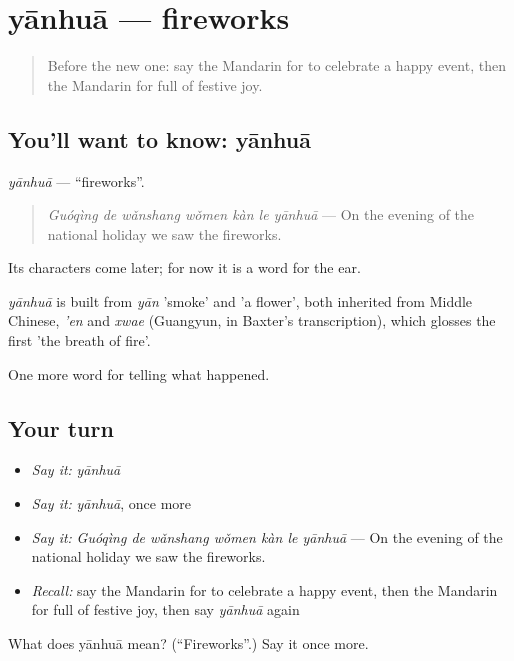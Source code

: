 \section[yānhuā]{yānhuā — fireworks}

\label{lesson:ZH-C339-yanhua}



\begin{quote}
Before the new one: say the Mandarin for to celebrate a happy event, then the Mandarin for full of festive joy.
\end{quote}

\subsection*{You'll want to know: yānhuā}
\emph{yānhuā} — \textquotedblleft{}fireworks\textquotedblright{}.

\begin{quote}
\emph{Guóqìng de wǎnshang wǒmen kàn le yānhuā} — On the evening of the national holiday we saw the fireworks.
\end{quote}

Its characters come later; for now it is a word for the ear.

\begin{cousinweb}
\emph{yānhuā} is built from \emph{yān} 'smoke' and  'a flower', both inherited from Middle Chinese, \emph{'en} and \emph{xwae} (Guangyun, in Baxter's transcription), which glosses the first 'the breath of fire'.
\end{cousinweb}

\begin{grammarlens}[title={What you've built}]
One more word for telling what happened.
\end{grammarlens}

\subsection*{Your turn}
\begin{itemize}
\raggedright
  \item \emph{Say it:} \emph{yānhuā}
  \item \emph{Say it:} \emph{yānhuā}, once more
  \item \emph{Say it:} \emph{Guóqìng de wǎnshang wǒmen kàn le yānhuā} — On the evening of the national holiday we saw the fireworks.
  \item \emph{Recall:} say the Mandarin for to celebrate a happy event, then the Mandarin for full of festive joy, then say \emph{yānhuā} again
\end{itemize}

\begin{tcolorbox}[breakable,colback=teal!4,colframe=teal!35!black,title={Before you move on}]
What does yānhuā mean? (\textquotedblleft{}Fireworks\textquotedblright{}.) Say it once more.
\end{tcolorbox}
